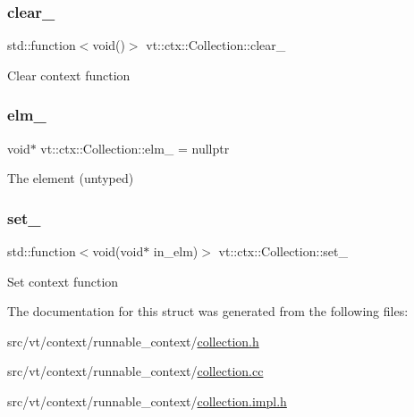 \subsubsection{\texorpdfstring{clear\+\_\+}{clear\_}}
{\footnotesize\ttfamily std\+::function$<$void()$>$ vt\+::ctx\+::\+Collection\+::clear\+\_\+\hspace{0.3cm}{\ttfamily [private]}}

Clear context function \mbox{\label{structvt_1_1ctx_1_1_collection_a74386b91e95eca571c746fbacada96ca}} 
\subsubsection{\texorpdfstring{elm\+\_\+}{elm\_}}
{\footnotesize\ttfamily void$\ast$ vt\+::ctx\+::\+Collection\+::elm\+\_\+ = nullptr\hspace{0.3cm}{\ttfamily [private]}}

The element (untyped) \mbox{\label{structvt_1_1ctx_1_1_collection_a27570daa078b9d23412e5e397db9ab8b}} 
\subsubsection{\texorpdfstring{set\+\_\+}{set\_}}
{\footnotesize\ttfamily std\+::function$<$void(void$\ast$ in\+\_\+elm)$>$ vt\+::ctx\+::\+Collection\+::set\+\_\+\hspace{0.3cm}{\ttfamily [private]}}

Set context function 

The documentation for this struct was generated from the following files\+:\begin{DoxyCompactItemize}
\item 
src/vt/context/runnable\+\_\+context/\hyperlink{collection_8h}{collection.\+h}\item 
src/vt/context/runnable\+\_\+context/\hyperlink{collection_8cc}{collection.\+cc}\item 
src/vt/context/runnable\+\_\+context/\hyperlink{collection_8impl_8h}{collection.\+impl.\+h}\end{DoxyCompactItemize}
